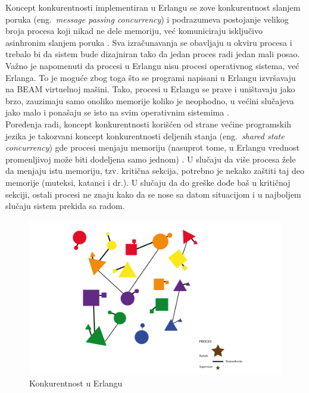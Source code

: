 \documentclass[a4paper]{article}
\begin{document}
{Koncept konkurentnosti implementiran u Erlangu se zove konkurentnost slanjem poruka (eng.~{\em message passing concurrency})
i podrazumeva postojanje velikog broja procesa koji nikad ne dele memoriju, već komuniciraju isključivo asinhronim slanjem poruka \cite{book_joe}.
Sva izračunavanja se obavljaju u okviru procesa i trebalo bi da sistem bude dizajniran tako da jedan proces radi jedan mali posao.
Važno je napomenuti da procesi u Erlangu nisu procesi operativnog sistema, već Erlanga.
To je moguće zbog toga što se programi napisani u Erlangu izvršavaju na BEAM virtuelnoj mašini.
Tako, procesi u Erlangu se prave i uništavaju jako brzo, zauzimaju samo onoliko memorije koliko je neophodno, u većini slučajeva jako malo
i ponašaju se isto na svim operativnim sistemima \cite{book_joe}.
\\

Poređenja radi, koncept konkurentnosti korišćen od strane većine programskih jezika je takozvani 
koncept konkurentnosti deljenih stanja (eng.~{\em shared state concurrency}) gde procesi 
menjaju memoriju (nasuprot tome, u Erlangu vrednost promenljivoj može biti dodeljena samo jednom) \cite{book_joe}. 
U slučaju da više procesa žele da menjaju istu memoriju, tzv. kritična sekcija, potrebno je 
nekako zaštiti taj deo memorije (muteksi, katanci i dr.). U slučaju da do greške dođe baš u kritičnoj sekciji,
ostali procesi ne znaju kako da se nose sa datom situacijom i u najboljem slučaju sistem prekida sa radom. 

\begin{figure}[h!]
\begin{center}
\includegraphics[scale=0.5]{actor_model.png}
\end{center}
\caption{Konkurentnost u Erlangu}
\label{fig:actor_model}
\end{figure}

}
\end{document}
